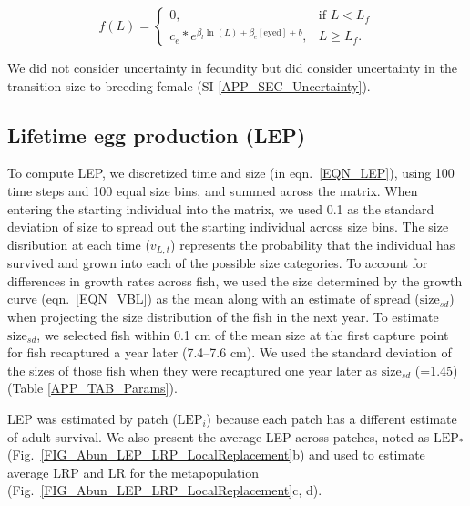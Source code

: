 \documentclass[12pt, oneside]{article}   	%
\begin{document}
\begin{equation}
f(L) = 
\begin{cases}
0, & \text{if } L < L_f \\
c_e * e^{\beta_l\ln(L) + \beta_e[\text{eyed}] + b}, & L \geq L_f. \label{EQN_Fec}
\end{cases}
\end{equation}

We did not consider uncertainty in fecundity but did consider uncertainty in the transition size to breeding female (SI \ref{APP_SEC_Uncertainty}).

\subsection{Lifetime egg production (LEP)} \label{APP_SEC_METHODS_LEP}

To compute LEP, we discretized time and size (in eqn.\ \ref{EQN_LEP}), using 100 time steps and 100 equal size bins, and summed across the matrix. When entering the starting individual into the matrix, we used 0.1 as the standard deviation of size to spread out the starting individual across size bins. The size disribution at each time ($v_{L,t}$) represents the probability that the individual has survived and grown into each of the possible size categories. To account for differences in growth rates across fish, we used the size determined by the growth curve (eqn.\ \ref{EQN_VBL}) as the mean along with an estimate of spread ($\text{size}_{sd}$) when projecting the size distribution of the fish in the next year. To estimate $\text{size}_{sd}$, we selected fish within 0.1 cm of the mean size at the first capture point for fish recaptured a year later (7.4--7.6 cm). We used the standard deviation of the sizes of those fish when they were recaptured one year later as $\text{size}_{sd}$ (=1.45) (Table \ref{APP_TAB_Params}). %

LEP was estimated by patch ($\text{LEP}_i$) because each patch has a different estimate of adult survival. We also present the average LEP across patches, noted as $\text{LEP}_*$ (Fig.\ \ref{FIG_Abun_LEP_LRP_LocalReplacement}b) and used to estimate average LRP and LR for the metapopulation (Fig.\ \ref{FIG_Abun_LEP_LRP_LocalReplacement}c, d). 
\end{document}
